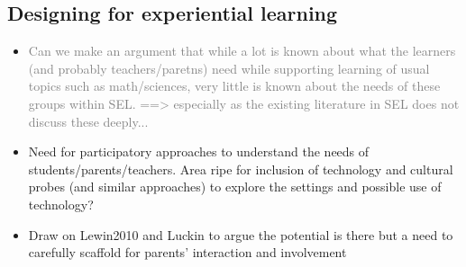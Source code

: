 \documentclass[prodmode,acmtochi]{acmsmall}
\newcommand{\rephrase}[1]{\textrm{\textrm{\textcolor{gray}{#1}}}}
\begin{document}
\begin{itemize}

\end{itemize}


\subsection{Designing for experiential learning }
	\begin{itemize}
		\item \rephrase{Can we make an argument that while a lot is known about what the learners (and probably teachers/paretns) need while supporting learning of usual topics such as math/sciences, very little is known about the needs of these groups within SEL. ==> especially as the existing literature in SEL does not discuss these deeply... }
		\item Need for participatory approaches to understand the needs of students/parents/teachers. Area ripe for inclusion of technology and cultural probes (and similar approaches) to explore the settings and possible use of technology? 
		\item Draw on Lewin2010 and Luckin to argue the potential is there but a need to carefully scaffold for parents' interaction and involvement
	\end{itemize}
\bigskip
\end{document}
